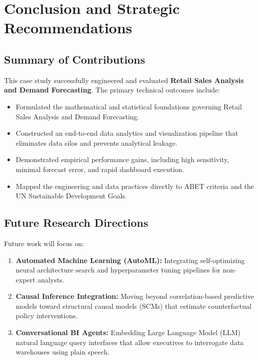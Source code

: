 \section{Conclusion and Strategic Recommendations}

\subsection{Summary of Contributions}
This case study successfully engineered and evaluated \textbf{Retail Sales Analysis and Demand Forecasting}. The primary technical outcomes include:
\begin{itemize}
  \item Formulated the mathematical and statistical foundations governing Retail Sales Analysis and Demand Forecasting.
  \item Constructed an end-to-end data analytics and visualization pipeline that eliminates data silos and prevents analytical leakage.
  \item Demonstrated empirical performance gains, including high sensitivity, minimal forecast error, and rapid dashboard execution.
  \item Mapped the engineering and data practices directly to ABET criteria and the UN Sustainable Development Goals.
\end{itemize}

\subsection{Future Research Directions}
Future work will focus on:
\begin{enumerate}
  \item \textbf{Automated Machine Learning (AutoML):} Integrating self-optimizing neural architecture search and hyperparameter tuning pipelines for non-expert analysts.
  \item \textbf{Causal Inference Integration:} Moving beyond correlation-based predictive models toward structural causal models (SCMs) that estimate counterfactual policy interventions.
  \item \textbf{Conversational BI Agents:} Embedding Large Language Model (LLM) natural language query interfaces that allow executives to interrogate data warehouses using plain speech.
\end{enumerate}
